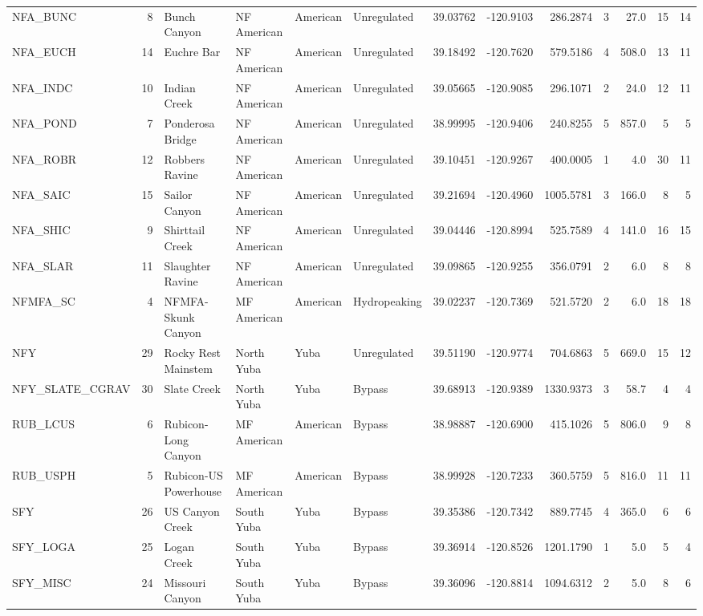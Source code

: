 \documentclass[proquest,12pt,final]{ucthesis-CA2012} %
\begin{document}
\begin{ucmainmatter}
\begin{landscape}
\begin{table}
{\begin{tabular}[t]{lrllllrrrrrrr}
NFA\_BUNC & 8 & Bunch Canyon & NF American & American & Unregulated & 39.03762 & -120.9103 & 286.2874 & 3 & 27.0 & 15 & 14\\
NFA\_EUCH & 14 & Euchre Bar & NF American & American & Unregulated & 39.18492 & -120.7620 & 579.5186 & 4 & 508.0 & 13 & 11\\
NFA\_INDC & 10 & Indian Creek & NF American & American & Unregulated & 39.05665 & -120.9085 & 296.1071 & 2 & 24.0 & 12 & 11\\
NFA\_POND & 7 & Ponderosa Bridge & NF American & American & Unregulated & 38.99995 & -120.9406 & 240.8255 & 5 & 857.0 & 5 & 5\\
\addlinespace
NFA\_ROBR & 12 & Robbers Ravine & NF American & American & Unregulated & 39.10451 & -120.9267 & 400.0005 & 1 & 4.0 & 30 & 11\\
NFA\_SAIC & 15 & Sailor Canyon & NF American & American & Unregulated & 39.21694 & -120.4960 & 1005.5781 & 3 & 166.0 & 8 & 5\\
NFA\_SHIC & 9 & Shirttail Creek & NF American & American & Unregulated & 39.04446 & -120.8994 & 525.7589 & 4 & 141.0 & 16 & 15\\
NFA\_SLAR & 11 & Slaughter Ravine & NF American & American & Unregulated & 39.09865 & -120.9255 & 356.0791 & 2 & 6.0 & 8 & 8\\
NFMFA\_SC & 4 & NFMFA-Skunk Canyon & MF American & American & Hydropeaking & 39.02237 & -120.7369 & 521.5720 & 2 & 6.0 & 18 & 18\\
\addlinespace
NFY & 29 & Rocky Rest Mainstem & North Yuba & Yuba & Unregulated & 39.51190 & -120.9774 & 704.6863 & 5 & 669.0 & 15 & 12\\
NFY\_SLATE\_CGRAV & 30 & Slate Creek & North Yuba & Yuba & Bypass & 39.68913 & -120.9389 & 1330.9373 & 3 & 58.7 & 4 & 4\\
RUB\_LCUS & 6 & Rubicon-Long Canyon & MF American & American & Bypass & 38.98887 & -120.6900 & 415.1026 & 5 & 806.0 & 9 & 8\\
RUB\_USPH & 5 & Rubicon-US Powerhouse & MF American & American & Bypass & 38.99928 & -120.7233 & 360.5759 & 5 & 816.0 & 11 & 11\\
SFY & 26 & US Canyon Creek & South Yuba & Yuba & Bypass & 39.35386 & -120.7342 & 889.7745 & 4 & 365.0 & 6 & 6\\
\addlinespace
SFY\_LOGA & 25 & Logan Creek & South Yuba & Yuba & Bypass & 39.36914 & -120.8526 & 1201.1790 & 1 & 5.0 & 5 & 4\\
SFY\_MISC & 24 & Missouri Canyon & South Yuba & Yuba & Bypass & 39.36096 & -120.8814 & 1094.6312 & 2 & 5.0 & 8 & 6\\

\end{tabular}}
\end{table}
\end{landscape}
\end{ucmainmatter}
\end{document}
